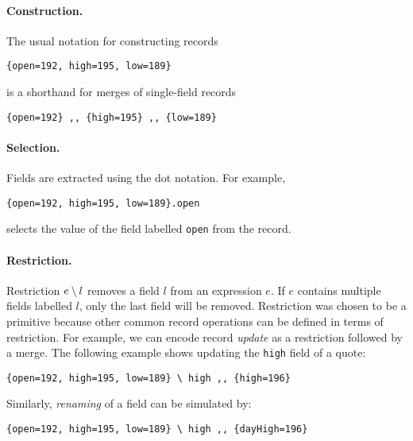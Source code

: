 \paragraph{Construction.} The usual notation for constructing records
\begin{lstlisting}
{open=192, high=195, low=189} 
\end{lstlisting}
is a shorthand for merges of single-field records
\begin{lstlisting}
{open=192} ,, {high=195} ,, {low=189} 
\end{lstlisting}

\paragraph{Selection.}
Fields are extracted using the dot notation. For example,
\begin{lstlisting}
{open=192, high=195, low=189}.open
\end{lstlisting}
selects the value of the field labelled \lstinline{open} from the record.

\paragraph{Restriction.}
Restriction $e \setminus l$ removes a field $l$ from an expression $e$. If $e$
contains multiple fields labelled $l$, only the last field will be removed.
Restriction was chosen to be a primitive because other common
record operations can be defined in terms of restriction. For example, we can encode record
\emph{update} as a restriction followed by a merge. The following example
shows updating the \lstinline{high} field of a quote:
\begin{lstlisting}
{open=192, high=195, low=189} \ high ,, {high=196} 
\end{lstlisting}
Similarly, \emph{renaming} of a field can be simulated by:
\begin{lstlisting}
{open=192, high=195, low=189} \ high ,, {dayHigh=196} 
\end{lstlisting}

\begin{comment}
Refinement of fields is also possible, in the sense
that the type of a new value can be a subtype of that of the old
one.~\footnote{The subtyping restriction is not required for the \name to be
  coherent and it leaves option open for language designers.}
\bruno{Are we going to show an example of this?}
\end{comment}

